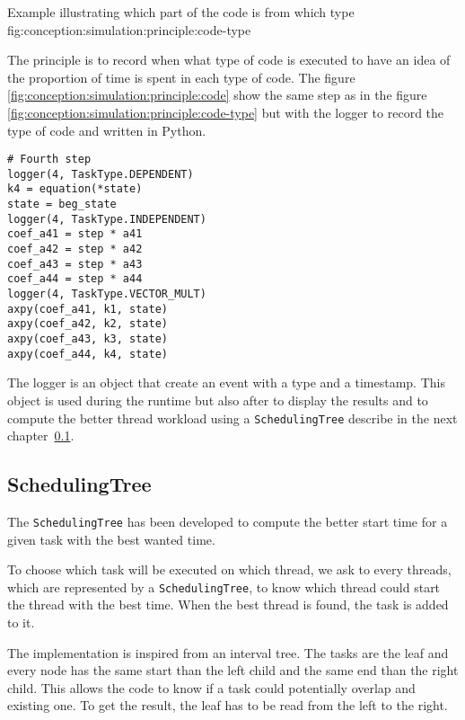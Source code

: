         {Example illustrating which part of the code is from which type}
        {fig:conception:simulation:principle:code-type}

The principle is to record when what type of code is executed to have an idea of
the proportion of time is spent in each type of code.
The figure \ref{fig:conception:simulation:principle:code} show the same step as
in the figure \ref{fig:conception:simulation:principle:code-type} but with the
logger to record the type of code and written in Python.

\begin{code}
    \label{code:conception:simulation:principle:code}
    \begin{verbatim}
# Fourth step
logger(4, TaskType.DEPENDENT)
k4 = equation(*state)
state = beg_state
logger(4, TaskType.INDEPENDENT)
coef_a41 = step * a41
coef_a42 = step * a42
coef_a43 = step * a43
coef_a44 = step * a44
logger(4, TaskType.VECTOR_MULT)
axpy(coef_a41, k1, state)
axpy(coef_a42, k2, state)
axpy(coef_a43, k3, state)
axpy(coef_a44, k4, state)
    \end{verbatim}
\end{code}

The logger is an object that create an event with a type and a timestamp.
This object is used during the runtime but also after to display the results and
to compute the better thread workload using a \texttt{SchedulingTree} describe in
the next chapter~\ref{ch:conception:simulation:scheduling}.

\subsection{SchedulingTree}
\label{ch:conception:simulation:scheduling}

The \texttt{SchedulingTree} has been developed to compute the better start time
for a given task with the best wanted time.

To choose which task will be executed on which thread, we ask to every threads,
which are represented by a \texttt{SchedulingTree}, to know which thread could
start the thread with the best time.
When the best thread is found, the task is added to it.

The implementation is inspired from an interval tree.
The tasks are the leaf and every node has the same start than the left child and
the same end than the right child.
This allows the code to know if a task could potentially overlap and existing one.
To get the result, the leaf has to be read from the left to the right.


